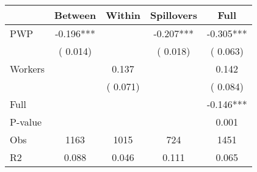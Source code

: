 
\begin{tabular}{l*{4}{c}}\hline&\multicolumn{1}{c}{Between}&\multicolumn{1}{c}{Within}&\multicolumn{1}{c}{Spillovers}&\multicolumn{1}{c}{Full}\\ \hline
 PWP           &             -0.196***      &                                               &       -0.207*** &        -0.305***                            \\ 
                               &        (       0.014)           &                                       &       (       0.018)     &      (       0.063)                                           \\ 
 Workers       &                                               &        0.137    &                                &             0.142                            \\ 
                               &                                               & (       0.071)                  &                                        &      (       0.084)                                           \\ 
\hline                                                                                                                                                                                                                                            
 Full                  &                                               &                                               &                                        &            -0.146***                                     \\ 
 P-value               &                                               &                                               &                                        &             0.001                                           \\ 
 Obs                   &               1163               &       1015                       &       724                &              1451                                               \\ 
 R2                    &                      0.088              &              0.046                      &              0.111               &                     0.065                                              \\ 
\hline \end{tabular}                                                                                                                                                                                                              
